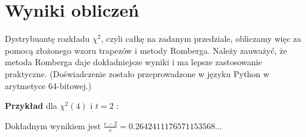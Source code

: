 \documentclass[a4paper,10pt]{article}
\begin{document}
    \section{Wyniki obliczeń}
    Dystrybuantę rozkładu $\chi^2$, czyli całkę na zadanym przedziale, obliczamy więc za pomocą złożonego wzoru trapezów i metody Romberga. Należy zauważyć, że metoda Romberga daje dokładniejsze wyniki i ma lepsze zastosowanie praktyczne. (Doświadczenie zostało przeprowadzone w języku Python w arytmetyce 64-bitowej.)
    
     \vspace{5mm} %
     \large{\textbf{Przykład} dla $\chi^2(4)$ i $t=2$ :}
     \vspace{5mm} %
     
     \normalsize{Dokładnym wynikiem jest $\frac{e-2}{e} =  0.2642411176571153568...$}
    
\end{document}
